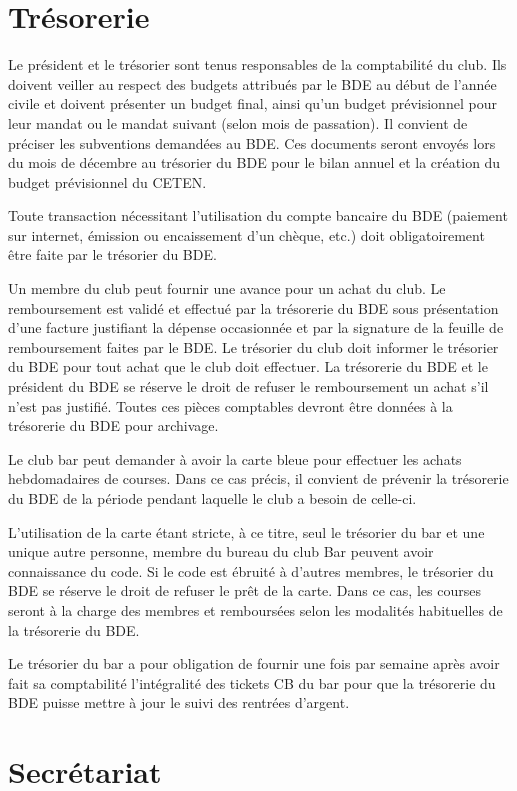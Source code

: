 \documentclass{article} %
\begin{document}
\begin{multicols}{2}
		\section{Trésorerie}
\label{sec:tresorerie}

		{\small
		
			Le président et le trésorier sont tenus responsables de la
			comptabilité du club. Ils doivent veiller au respect des budgets
			attribués par le BDE au début de l’année civile et doivent présenter
			un budget final, ainsi qu’un budget prévisionnel pour leur mandat ou
			le mandat suivant (selon mois de passation). Il convient de préciser
			les subventions demandées au BDE\@. Ces documents seront envoyés
			lors du mois de décembre au trésorier du BDE pour le bilan annuel et
			la création du budget prévisionnel du CETEN\@.

			Toute transaction nécessitant l’utilisation du compte bancaire du
			BDE (paiement sur internet, émission ou encaissement d’un chèque,
			etc.) doit obligatoirement être faite par le trésorier du BDE\@.

			Un membre du club peut fournir une avance pour un achat du club. Le
			remboursement est validé et effectué par la trésorerie du BDE sous
			présentation d’une facture justifiant la dépense occasionnée et par
			la signature de la feuille de remboursement faites par le BDE\@. Le
			trésorier du club doit informer le trésorier du BDE pour tout achat
			que le club doit effectuer. La trésorerie du BDE et le président du
			BDE se réserve le droit de refuser le remboursement un achat s’il
			n’est pas justifié. Toutes ces pièces comptables devront être
			données à la trésorerie du BDE pour archivage.

			Le club bar peut demander à avoir la carte bleue pour effectuer les
			achats hebdomadaires de courses. Dans ce cas précis, il convient de
			prévenir la trésorerie du BDE de la période pendant laquelle le club
			a besoin de celle-ci.

			L’utilisation de la carte étant stricte, à ce titre, seul le
			trésorier du bar et une unique autre personne, membre du bureau du
			club Bar peuvent avoir connaissance du code. Si le code est ébruité
			à d’autres membres, le trésorier du BDE se réserve le droit de
			refuser le prêt de la carte. Dans ce cas, les courses seront à la
			charge des membres et remboursées selon les modalités habituelles de
			la trésorerie du BDE\@.

			Le trésorier du bar a pour obligation de fournir une fois par
			semaine après avoir fait sa comptabilité l’intégralité des tickets
			CB du bar pour que la trésorerie du BDE puisse mettre à jour le
			suivi des rentrées d’argent.

		}

		\section{Secrétariat}
\label{sec:secretariat}

	\end{multicols}
\end{document}
